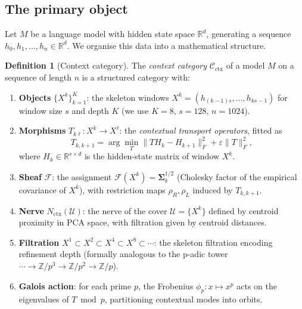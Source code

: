 \documentclass[11pt]{amsart}
\theoremstyle{definition}
\newtheorem{definition}[theorem]{Definition}
\newcommand{\Cctx}{\mathcal{C}_{\!\mathrm{ctx}}}
\newcommand{\Nctx}{N_{\mathrm{ctx}}}
\newcommand{\Z}{\mathbb{Z}}
\newcommand{\rhoR}{\rho_R}
\newcommand{\rhoL}{\rho_L}
\begin{document}
\subsection{The primary object}

Let $M$ be a language model with hidden state space $\mathbb{R}^d$,
generating a sequence $h_0, h_1, \ldots, h_n \in \mathbb{R}^d$.
We organise this data into a mathematical structure.

\begin{definition}[Context category]
\label{def:Cctx}
The \emph{context category} $\Cctx$ of a model $M$ on a sequence of
length $n$ is a structured category with:
\begin{enumerate}[label=(\roman*)]
\item \textbf{Objects} $\{X^k\}_{k=1}^K$: the skeleton windows
  $X^k = (h_{(k-1)s}, \ldots, h_{ks-1})$
  for window size $s$ and depth $K$ (we use $K=8$, $s=128$, $n=1024$).

\item \textbf{Morphisms} $T_{k\ell}: X^k \to X^\ell$: the
  \emph{contextual transport operators}, fitted as
  \[
    T_{k,k+1} = \arg\min_{T} \bigl\|T H_k - H_{k+1}\bigr\|_F^2
    + \varepsilon \|T\|_F^2,
  \]
  where $H_k \in \mathbb{R}^{s \times d}$ is the hidden-state matrix
  of window $X^k$.

\item \textbf{Sheaf} $\mathcal{F}$: the assignment
  $\mathcal{F}(X^k) = \boldsymbol{\Sigma}_k^{1/2}$
  (Cholesky factor of the empirical covariance of $X^k$),
  with restriction maps $\rhoR, \rhoL$ induced by $T_{k,k+1}$.

\item \textbf{Nerve} $\Nctx(\mathcal{U})$: the nerve of the cover
  $\mathcal{U} = \{X^k\}$ defined by centroid proximity in PCA space,
  with filtration given by centroid distances.

\item \textbf{Filtration} $X^1 \subset X^2 \subset X^4 \subset X^8 \subset \cdots$:
  the skeleton filtration encoding refinement depth
  (formally analogous to the p-adic tower
  $\cdots \to \Z/p^3 \to \Z/p^2 \to \Z/p$).

\item \textbf{Galois action}: for each prime $p$, the Frobenius
  $\phi_p: x \mapsto x^p$ acts on the eigenvalues of $T \bmod p$,
  partitioning contextual modes into orbits.
\end{enumerate}
\end{definition}
\end{document}
